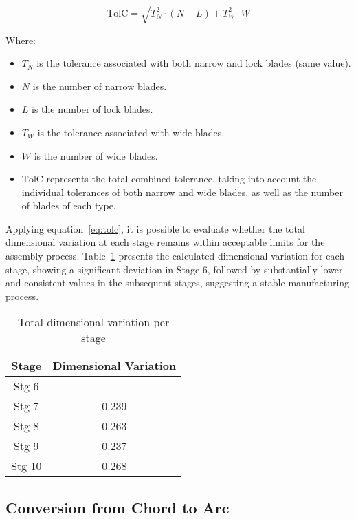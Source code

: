 \begin{equation}
\text{TolC} = \sqrt{T_N^2 \cdot (N + L) + T_W^2 \cdot W}
\end{equation}

Where:
\begin{itemize}
    \label{eq:tolc}
    \item \( T_N \) is the tolerance associated with both narrow and lock blades (same value).
    \item \( N \) is the number of narrow blades.
    \item \( L \) is the number of lock blades.
    \item \( T_W \) is the tolerance associated with wide blades.
    \item \( W \) is the number of wide blades.
    \item \( \text{TolC} \) represents the total combined tolerance, taking into account the individual tolerances of both narrow and wide blades, as well as the number of blades of each type.
\end{itemize}

Applying equation~\ref{eq:tolc}, it is possible to evaluate whether the total dimensional variation at each stage remains within acceptable limits for the assembly process. 
Table~\ref{tab:dimensional variation} presents the calculated dimensional variation for each stage, showing a significant deviation in Stage 6, followed by substantially lower and consistent values in the subsequent stages, suggesting a stable manufacturing process.


\begin{table}[H]
    \centering
    \caption{Total dimensional variation per stage}
    \label{tab:dimensional variation}
    \begin{tabular}{cc}
        \hline
        \textbf{Stage} & \textbf{Dimensional Variation} \\
        \hline
        Stg 6 &         \\
        Stg 7 &  0.239  \\
        Stg 8 & 0.263   \\
        Stg 9 & 0.237   \\
        Stg 10 & 0.268  \\
        \hline
    \end{tabular}
\end{table}

\subsection{Conversion from Chord to Arc}

